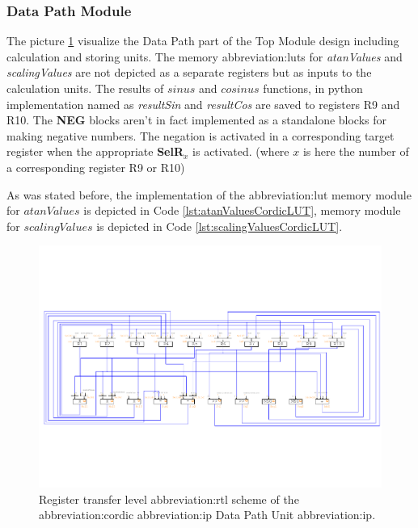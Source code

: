 \documentclass[a4paper, twoside, 11pt]{article}
\begin{document}
        \subsubsection{Data Path Module}
            The picture \ref{fig:cordic-rtl} visualize the Data Path part of the Top Module design including calculation and storing units. The memory \gls{abbreviation:lut}s for \textit{atanValues} and \textit{scalingValues} are not depicted as a separate registers but as inputs to the calculation units. The results of $sinus$ and $cosinus$ functions, in python implementation named as \textit{resultSin} and \textit{resultCos} are saved to registers R9 and R10. The \textbf{NEG} blocks aren't in fact implemented as a standalone blocks for making negative numbers. The negation is activated in a corresponding target register when the appropriate \textbf{SelR$_x$} is activated. (where $x$ is here the number of a corresponding register R9 or R10)\par
            As was stated before, the implementation of the \gls{abbreviation:lut} memory module for $atanValues$ is depicted in Code \ref{lst:atanValuesCordicLUT}, memory module for $scalingValues$ is depicted in Code \ref{lst:scalingValuesCordicLUT}.
            \begin{figure}[htbp!]
                \centering
                \includegraphics[width=1\textwidth]{src/pdf/cordic-rtl.pdf}
                \caption{Register transfer level \gls{abbreviation:rtl} scheme of the \gls{abbreviation:cordic} \gls{abbreviation:ip} Data Path Unit \gls{abbreviation:ip}.}
                \label{fig:cordic-rtl}
            \end{figure}
            
\end{document}
